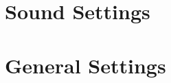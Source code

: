 \chapter{Sound Settings}
\label{ref:configure_rockbox_sound}
  

\chapter{General Settings}
\label{ref:configure_rockbox_general}
  
    
    
    
    
    
    
    